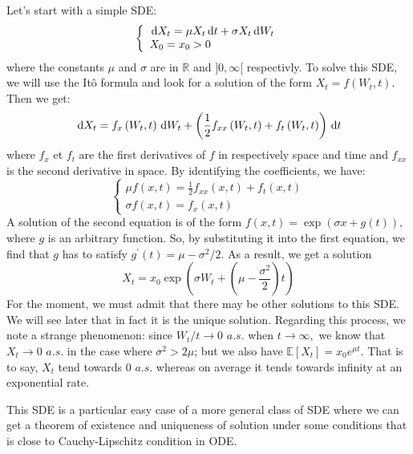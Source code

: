 	Let's start with a simple SDE:
	$$
	\left\{\begin{array}{l}
	\,\mathrm{d} X_{t}=\mu X_{t} \,\mathrm{d} t+\sigma X_{t} \,\mathrm{d} W_{t} \\
	X_{0}=x_{0}>0
	\end{array}\right.
	$$
	where the constants $\mu$ and $\sigma$ are in $\mathbb{R}$ and $]0, \infty[$ respectivly. To solve this SDE, we will use the Itô formula and look for a solution of the form $X_{t}=f\left(W_{t}, t\right).$ Then we get:
	$$
	\,\mathrm{d} X_{t}=f_{x}\left(W_{t}, t\right) \,\mathrm{d} W_{t}+\left(\frac{1}{2} f_{x x}\left(W_{t}, t\right)+f_{t}\left(W_{t}, t\right)\right) \,\mathrm{d} t
	$$
	where $f_{x}$ et $f_{t}$ are the first derivatives of $f$ in respectively space and time and $f_{x x}$ is the second derivative in space. By identifying the coefficients, we have:
	$$
	\left\{\begin{array}{l}
	\mu f(x, t)=\frac{1}{2} f_{x x}(x, t)+f_{t}(x, t) \\
	\sigma f(x, t)=f_{x}(x, t)
	\end{array}\right.
	$$
	A solution of the second equation is of the form $f(x, t)=\exp (\sigma x+g(t)),$ where $g$ is an arbitrary function. So, by substituting it into the first equation, we find that
	$g$ has to satisfy $g^{\prime}(t)=\mu-\sigma^{2} / 2 .$ As a result, we get a solution
	$$
	X_{t}=x_{0} \exp \left(\sigma W_t+\left(\mu-\frac{\sigma^{2}}{2}\right) t\right)
	$$
	For the moment, we must admit that there may be other solutions to this SDE. We will see later that in fact it is the unique solution.
	Regarding this process, we note a strange phenomenon: since $W_{t} / t \rightarrow 0$  $a.s.$ when $t \rightarrow \infty,$ we know that $X_{t} \rightarrow 0$ $a.s.$ in the case where $\sigma^{2}>2 \mu$; but we also have $\mathbb{E}\left[X_{t}\right]=x_{0} e^{\mu t}$. That is to say,  $ X_{t}$ tend towards 0 $a.s.$ whereas on average it tends towards infinity at an exponential rate.

This SDE is a particular easy case of a more general class of SDE where we can get a theorem of existence and uniqueness of solution under some conditions that is close to Cauchy-Lipschitz condition in ODE.
%
